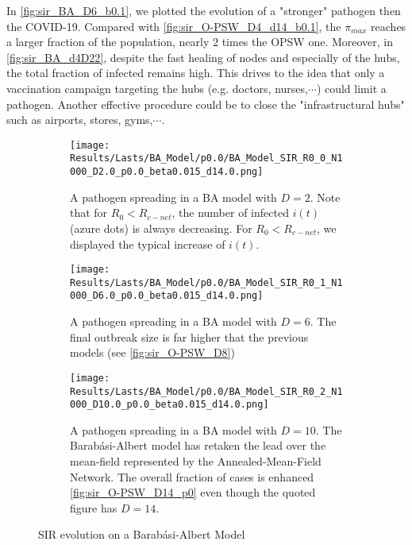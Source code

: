 \documentclass[a4paper,10pt, oneside]{book} %
\theoremstyle{definition}
\begin{document}
In \autoref{fig:sir_BA_D6_b0.1}, we plotted the evolution of a "stronger" pathogen then the COVID-19.
Compared with \autoref{fig:sir_O-PSW_D4_d14_b0.1}, the $ \pi_{max} $ reaches a larger fraction of the population, nearly $ 2$ times the OPSW one.
Moreover, in \autoref{fig:sir_BA_d4D22}, despite the fast healing of nodes and especially of the hubs, the total fraction of infected remains high. This drives to the idea that only a vaccination campaign targeting the hubs (e.g. doctors, nurses,$\cdots$) could limit a pathogen. Another effective procedure could be to close the "infrastructural hubs" such as airports, stores, gyms,$ \cdots $.

\clearpage
{}
\thispagestyle{empty}
\begin{figure}[H]
	\begin{subfigure}{\linewidth}
		\centering
		\texttt{[image: Results/Lasts/BA\_Model/p0.0/BA\_Model\_SIR\_R0\_0\_N1000\_D2.0\_p0.0\_beta0.015\_d14.0.png]}
		\caption{A pathogen spreading in a BA model with $D = 2$. Note that for $ R_0 < R_{c-net} $, the number of infected $ i(t)$ (azure dots) is always decreasing. For $ R_0 < R_{c-net} $, we displayed the typical increase of $ i(t)$.}
		\label{fig:sir_BA_D2}
	\end{subfigure}
	\vspace{.5cm}
	\begin{subfigure}{\linewidth}
		\centering
		\texttt{[image: Results/Lasts/BA\_Model/p0.0/BA\_Model\_SIR\_R0\_1\_N1000\_D6.0\_p0.0\_beta0.015\_d14.0.png]}
		\caption{A pathogen spreading in a BA model with $D = 6$. The final outbreak size is far higher that the previous models (see \autoref{fig:sir_O-PSW_D8})}
		\label{fig:sir_BA_D6}
	\end{subfigure}
	\vfill
	\begin{subfigure}{\linewidth}
		\centering
		\texttt{[image: Results/Lasts/BA\_Model/p0.0/BA\_Model\_SIR\_R0\_2\_N1000\_D10.0\_p0.0\_beta0.015\_d14.0.png]}
		\caption{A pathogen spreading in a BA model with $D = 10$. The Barabási-Albert model has retaken the lead over the mean-field represented by the Annealed-Mean-Field Network. The overall fraction of cases is enhanced \autoref{fig:sir_O-PSW_D14_p0} even though the quoted figure has $ D = 14$.}
		\label{fig:sir_BA_D10}
	\end{subfigure}
	\caption{SIR evolution on a Barabási-Albert Model}
	\label{fig:sir_BA_COVID}
\end{figure}
\end{document}
